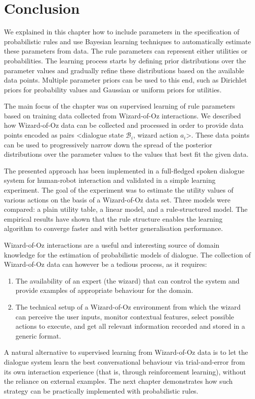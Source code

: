 \section{Conclusion}
\label{sec:woz-conclusions}


We explained in this chapter how to include parameters in the specification of probabilistic rules and use Bayesian learning techniques to automatically estimate these parameters from data.  The rule parameters can represent either utilities or probabilities.  The learning process starts by defining prior distributions over the parameter values and gradually refine these distributions based on the available data points. Multiple parameter priors can be used to this end, such as Dirichlet priors for probability values and Gaussian or uniform priors for utilities. 

The main focus of the chapter was on supervised learning of rule parameters based on training data collected from Wizard-of-Oz interactions. We described how Wizard-of-Oz data can be collected and processed in order to provide data points encoded as pairs <dialogue state $\mathcal{B}_i$, wizard action $a_i$>.  
These data points can be used to progressively narrow down the spread of the posterior distributions over the parameter values to the values that best fit the given data. 

The presented approach has been implemented in a full-fledged spoken dialogue system for human-robot interaction and validated in a simple learning experiment.  The goal of the experiment was to estimate the utility values of various actions on the basis of a Wizard-of-Oz data set.  Three models were compared: a plain utility table, a linear model, and a rule-structured model. The empirical results have shown that the rule structure enables the learning algorithm to converge faster and with better generalisation performance.

Wizard-of-Oz interactions are a useful and interesting source of domain knowledge for the estimation of probabilistic models of dialogue. The collection of Wizard-of-Oz data can however be a tedious process, as it requires:
\begin{enumerate}
\item The availability of an expert (the wizard) that can control the system and provide examples of appropriate behaviour for the domain.
\item The technical setup of a Wizard-of-Oz environment from which the wizard can perceive the user inputs, monitor contextual features, select possible actions to execute, and get all relevant information recorded and stored in a generic format. 
\end{enumerate}

A natural alternative to supervised learning from Wizard-of-Oz data is to let the dialogue system learn the best conversational behaviour via trial-and-error from its own interaction experience (that is, through reinforcement learning), without the reliance on external examples.  The next chapter demonstrates how such strategy can be practically implemented with probabilistic rules. 
